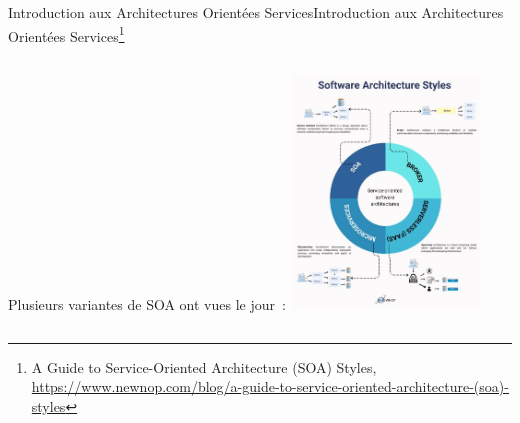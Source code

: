 \documentclass{beamer}
\begin{document}
    \begin{frame}{Introduction aux Architectures Orientées Services}{Introduction aux Architectures Orientées Services\footnote{\label{newop-soa}A Guide to Service-Oriented Architecture (SOA) Styles, \url{https://www.newnop.com/blog/a-guide-to-service-oriented-architecture-(soa)-styles}}}
        \begin{columns}
            Plusieurs variantes de SOA ont vues le jour~:
            \centering
            \includegraphics[width=5cm]{image/diversity-of-soa}
        \end{columns}
    \end{frame}
\end{document}
